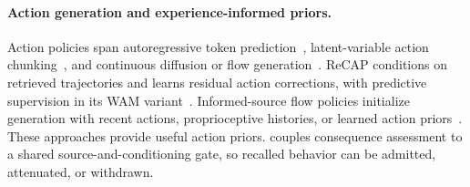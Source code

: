 \paragraph{Action generation and experience-informed priors.}
Action policies span autoregressive token prediction~\citep{kim2025openvla}, latent-variable action chunking~\citep{zhao2023act}, and continuous diffusion or flow generation~\citep{chi2023diffusionpolicy,black2025pi0}.
ReCAP conditions on retrieved trajectories and learns residual action corrections, with predictive supervision in its WAM variant~\citep{park2026recap}.
Informed-source flow policies initialize generation with recent actions, proprioceptive histories, or learned action priors~\citep{kang2026warmprior,jia2026a2a,machado2026lafm}.
These approaches provide useful action priors. \method{} couples consequence assessment to a shared source-and-conditioning gate, so recalled behavior can be admitted, attenuated, or withdrawn.
